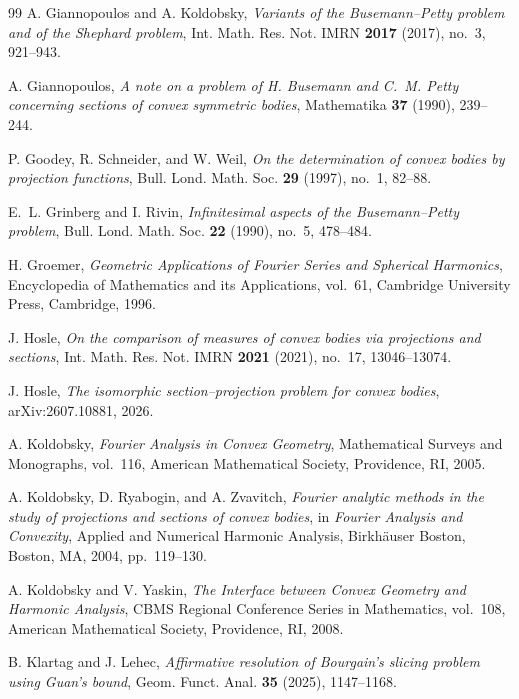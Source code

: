 \documentclass[11pt]{article}
\theoremstyle{remark}
\begin{document}
\begin{thebibliography}{99}
A. Giannopoulos and A. Koldobsky,
\emph{Variants of the Busemann--Petty problem and of the Shephard problem},
Int. Math. Res. Not. IMRN \textbf{2017} (2017), no.~3, 921--943.

A. Giannopoulos,
\emph{A note on a problem of H. Busemann and C.~M. Petty concerning
sections of convex symmetric bodies},
Mathematika \textbf{37} (1990), 239--244.

P. Goodey, R. Schneider, and W. Weil,
\emph{On the determination of convex bodies by projection functions},
Bull. Lond. Math. Soc. \textbf{29} (1997), no.~1, 82--88.


E.~L. Grinberg and I. Rivin,
\emph{Infinitesimal aspects of the Busemann--Petty problem},
Bull. Lond. Math. Soc. \textbf{22} (1990), no.~5, 478--484.



H. Groemer,
\emph{Geometric Applications of Fourier Series and Spherical Harmonics},
Encyclopedia of Mathematics and its Applications, vol.~61,
Cambridge University Press, Cambridge, 1996.

J. Hosle,
\emph{On the comparison of measures of convex bodies via projections and
sections},
Int. Math. Res. Not. IMRN \textbf{2021} (2021), no.~17, 13046--13074.

J. Hosle,
\emph{The isomorphic section--projection problem for convex bodies},
arXiv:2607.10881, 2026.




A. Koldobsky,
\emph{Fourier Analysis in Convex Geometry},
Mathematical Surveys and Monographs, vol.~116,
American Mathematical Society, Providence, RI, 2005.

A. Koldobsky, D. Ryabogin, and A. Zvavitch,
\emph{Fourier analytic methods in the study of projections and sections of
convex bodies},
in \emph{Fourier Analysis and Convexity}, Applied and Numerical Harmonic
Analysis, Birkh\"auser Boston, Boston, MA, 2004, pp.~119--130.

A. Koldobsky and V. Yaskin,
\emph{The Interface between Convex Geometry and Harmonic Analysis},
CBMS Regional Conference Series in Mathematics, vol.~108,
American Mathematical Society, Providence, RI, 2008.





B. Klartag and J. Lehec,
\emph{Affirmative resolution of Bourgain's slicing problem using Guan's
bound},
Geom. Funct. Anal. \textbf{35} (2025), 1147--1168.


\end{thebibliography}
\end{document}
